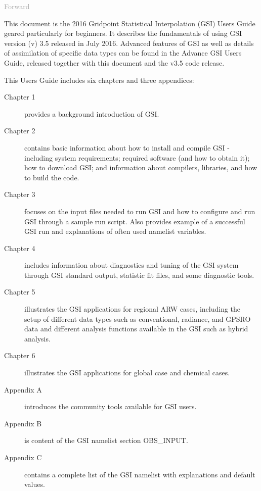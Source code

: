 \begin{titlepage}
\vspace*{0.5cm}
\noindent

\begin{flushleft}
\textcolor{darkgray}{\LARGE Forward}
\vspace*{1cm}\par

This document is the 2016 Gridpoint Statistical Interpolation (GSI) User\textquotesingle s Guide geared particularly for beginners. It describes the fundamentals of using GSI version (v) 3.5 released in July 2016. Advanced features of GSI as well as details of assimilation of specific data types can be found in the Advance GSI User\textquotesingle s Guide, released together with this document and the v3.5 code release.

This User\textquotesingle s Guide includes six chapters and three appendices:
\begin{description}
\item[Chapter 1] provides a background introduction of GSI.
\item[Chapter 2] contains basic information about how to install and compile GSI - including system requirements; required software (and how to obtain it); how to download GSI; and information about compilers, libraries, and how to build the code.
\item[Chapter 3] focuses on the input files needed to run GSI and how to configure and run GSI through a sample run script. Also provides example of a successful GSI run and explanations of often used namelist variables.
\item[Chapter 4] includes information about diagnostics and tuning of the GSI system through GSI standard output, statistic fit files, and some diagnostic tools.
\item[Chapter 5] illustrates the GSI applications for regional ARW cases, including the setup of different data types such as conventional, radiance, and GPSRO data and different analysis functions available in the GSI such as hybrid analysis.
\item[Chapter 6] illustrates the GSI applications for  global case and chemical cases.
\item[Appendix A] introduces the community tools available for GSI users.
\item[Appendix B] is content of the GSI namelist section OBS\_INPUT.
\item[Appendix C] contains a complete list of the GSI namelist with explanations and default values.
\end{description}


\end{flushleft}
\end{titlepage}
